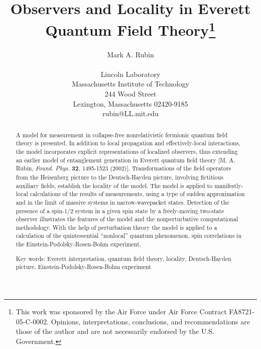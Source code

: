 \documentclass[12pt]{article}
\begin{document}
\title{\bf 
Observers and Locality in Everett Quantum Field Theory\thanks{
This
work was sponsored by the Air Force under Air Force
Contract FA8721-05-C-0002. Opinions, interpretations,
conclusions, and recommendations are those
of the author and are not necessarily endorsed by
the U.S. Government.
}
}
\author{
Mark A. Rubin\\
\mbox{}\\  
Lincoln Laboratory\\ 
Massachusetts Institute of Technology\\  
244 Wood Street\\                         
Lexington, Massachusetts 02420-9185\\      
rubin@LL.mit.edu\\ 
}
\date{\mbox{}}
\maketitle



\begin{abstract}
A model for measurement in collapse-free nonrelativistic fermionic quantum field theory
is presented. In addition to local propagation and effectively-local interactions, the model incorporates explicit representations of localized observers, thus extending an earlier model of entanglement generation  in Everett quantum field theory 
[M. A. Rubin, {\em Found. Phys.}\/ {\bf 32}, 1495-1523 (2002)].  Transformations of the field operators  from the Heisenberg picture
to the Deutsch-Hayden picture, involving fictitious auxiliary fields,
 establish the locality of the model.  The model is applied to manifestly-local calculations of the results of measurements, using  a type of sudden approximation and in the limit of massive systems in narrow-wavepacket states.  
Detection of the presence of a spin-1/2 system in a given spin state by a freely-moving two-state observer illustrates the features of the model and the nonperturbative computational 
methodology.
With the help of perturbation theory the model is applied to a  calculation of the quintessential ``nonlocal'' quantum phenomenon,  spin correlations in the Einstein-Podolsky-Rosen-Bohm experiment.

\mbox{}

\noindent Key words: Everett interpretation, quantum field theory, locality, Deutsch-Hayden picture, Einstein-Podolsky-Rosen-Bohm experiment
\end{abstract}
\end{document}
